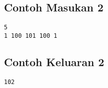 \documentclass{article}
\begin{document}
\begin{multicols}{2}
\subsection*{Contoh Masukan 2}
\begin{lstlisting}
5
1 100 101 100 1
\end{lstlisting}
\columnbreak
\subsection*{Contoh Keluaran 2}
\begin{lstlisting}
102
\end{lstlisting}
\vfill
\end{multicols}




\pagebreak
\end{document}
